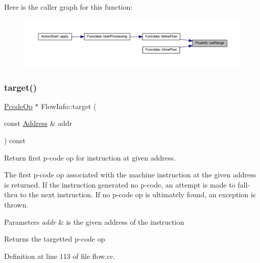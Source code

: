 Here is the caller graph for this function\+:
\nopagebreak
\begin{figure}[H]
\begin{center}
\leavevmode
\includegraphics[width=350pt]{class_flow_info_a4d268b911548180e9b86f4551d306477_icgraph}
\end{center}
\end{figure}
\mbox{\label{class_flow_info_a79b96fb0e47a98e97da11975f9fd5e0b}} 
\subsubsection{\texorpdfstring{target()}{target()}}
{\footnotesize\ttfamily \mbox{\hyperlink{class_pcode_op}{Pcode\+Op}} $\ast$ Flow\+Info\+::target (\begin{DoxyParamCaption}\item[{const \mbox{\hyperlink{class_address}{Address}} \&}]{addr }\end{DoxyParamCaption}) const}



Return first p-\/code op for instruction at given address. 

The first p-\/code op associated with the machine instruction at the given address is returned. If the instruction generated no p-\/code, an attempt is made to fall-\/thru to the next instruction. If no p-\/code op is ultimately found, an exception is thrown. 
\begin{DoxyParams}{Parameters}
{\em addr} & is the given address of the instruction \\
\hline
\end{DoxyParams}
\begin{DoxyReturn}{Returns}
the targetted p-\/code op 
\end{DoxyReturn}


Definition at line 113 of file flow.\+cc.

